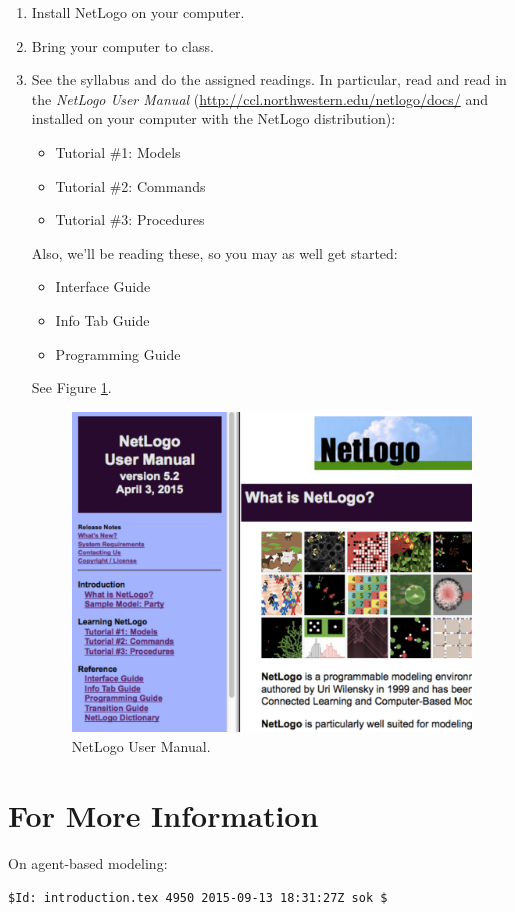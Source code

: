 \begin{enumerate}
\item Install NetLogo on your computer.
\item Bring your computer to class.
\item See the syllabus and do the assigned readings. In particular,
  read \citep[chapter 2, pages 45--68]{wilensky_rand_2015} and read in the {\it NetLogo User Manual}
  (\url{http://ccl.northwestern.edu/netlogo/docs/} and installed on
  your computer
  with the NetLogo distribution):
\begin{itemize}
\item Tutorial \#1: Models
\item Tutorial \#2: Commands
\item Tutorial \#3: Procedures
\end{itemize}
Also, we'll be reading these, so you may as well get started:
\begin{itemize}
\item Interface Guide
\item Info Tab Guide
\item Programming Guide
\end{itemize}
See Figure \ref{fig:NetLogoUserManual}.

\begin{figure}[htbp] %
   \centering
   \includegraphics[width=\textwidth]{figures/NetLogoUserManual.pdf}  
   \caption{NetLogo User Manual.} 
   \label{fig:NetLogoUserManual}
\end{figure}
\end{enumerate}

\newpage\clearpage

\section{For More Information}

On agent-based modeling: \citep{bankes_lempert_popper_2002,epstein_axtell_1996,gilbert_2008,grimm_railsback_2005,miller_page_2007,railsback_gramm_netlogo_2012,wilensky_rand_2015}

\vfill
\noindent\verb+$Id: introduction.tex 4950 2015-09-13 18:31:27Z sok $+